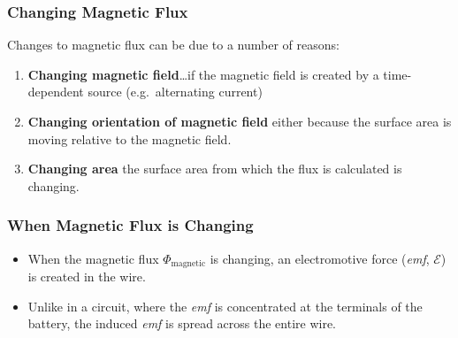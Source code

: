 \documentclass[12pt,aspectratio=169]{beamer}
\newcommand{\mb}[1]{\mathbf{#1}}
\begin{document}
\begin{frame}
  \frametitle{Changing Magnetic Flux}
  Changes to magnetic flux can be due to a number of reasons:
  \begin{enumerate}
  \item\textbf{Changing magnetic field}\ldots if the magnetic field is created
    by a time-dependent source (e.g.\ alternating current)
  \item\textbf{Changing orientation of magnetic field} either because the
    surface area is moving relative to the magnetic field.
  \item\textbf{Changing area} the surface area from which the flux is
    calculated is changing.
  \end{enumerate}
\end{frame}


\begin{frame}
  \frametitle{When Magnetic Flux is Changing}

  \begin{itemize}
  \item When the magnetic flux $\Phi_{\textrm{magnetic}}$ is changing, an
    electromotive force (\emph{emf}, $\mathcal{E}$) is created in the wire.
  \item Unlike in a circuit, where the \emph{emf} is concentrated at the
    terminals of the battery, the induced \emph{emf} is spread across the
    entire wire.
  \end{itemize}
  \begin{columns}
    \begin{center}
    \end{center}
    

\end{columns}
\end{frame}
\end{document}

